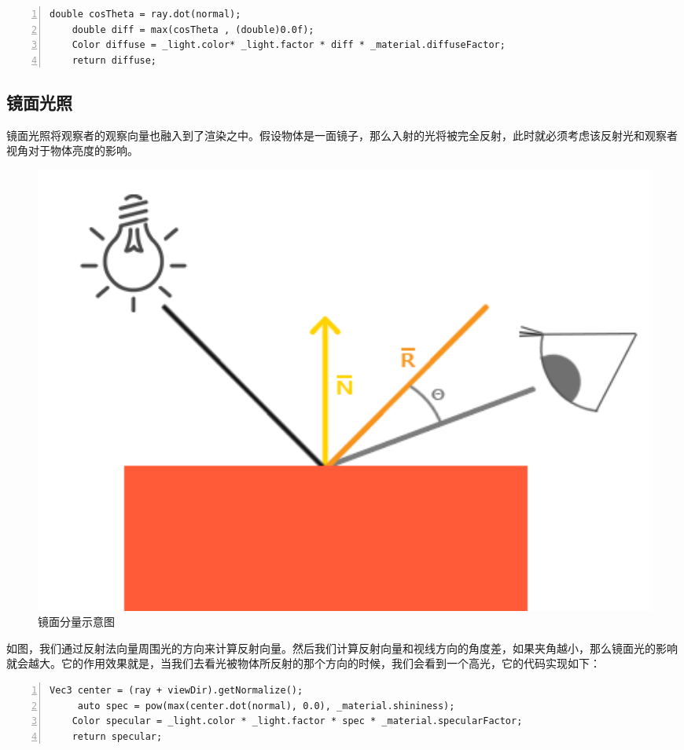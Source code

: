 \begin{spacing}{2.5}
	\begin{lstlisting}[language={[ANSI]C},numbers=left,numberstyle=\tiny,%frame=shadowbox,
   rulesepcolor=\color{red!20!green!20!blue!20},
   keywordstyle=\color{blue!70!black},
   commentstyle=\color{blue!90!},
   basicstyle=\ttfamily]
	double cosTheta = ray.dot(normal);
    double diff = max(cosTheta , (double)0.0f);
    Color diffuse = _light.color* _light.factor * diff * _material.diffuseFactor;
    return diffuse;
	\end{lstlisting}
	
	\subsection{镜面光照}
	
	镜面光照将观察者的观察向量也融入到了渲染之中。假设物体是一面镜子，那么入射的光将被完全反射，此时就必须考虑该反射光和观察者视角对于物体亮度的影响。
	
    \begin{figure}[H]
    	\centering
		\includegraphics[width=1.0\textwidth]{images/specular_light.png}
		\caption{镜面分量示意图}
		\label{specular_light}
    \end{figure}
    
    如图，我们通过反射法向量周围光的方向来计算反射向量。然后我们计算反射向量和视线方向的角度差，如果夹角越小，那么镜面光的影响就会越大。它的作用效果就是，当我们去看光被物体所反射的那个方向的时候，我们会看到一个高光，它的代码实现如下：
    \begin{lstlisting}[language={[ANSI]C},numbers=left,numberstyle=\tiny,%frame=shadowbox,
   rulesepcolor=\color{red!20!green!20!blue!20},
   keywordstyle=\color{blue!70!black},
   commentstyle=\color{blue!90!},
   basicstyle=\ttfamily]
   Vec3 center = (ray + viewDir).getNormalize();
	 auto spec = pow(max(center.dot(normal), 0.0), _material.shininess);
    Color specular = _light.color * _light.factor * spec * _material.specularFactor;
    return specular;
	\end{lstlisting}
    

\end{spacing}
